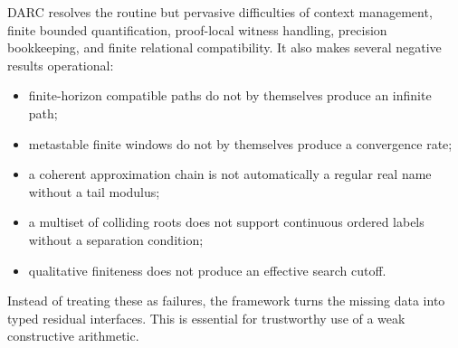 DARC resolves the routine but pervasive difficulties of context management,
finite bounded quantification, proof-local witness handling, precision
bookkeeping, and finite relational compatibility.  It also makes several
negative results operational:
\begin{itemize}
  \item finite-horizon compatible paths do not by themselves produce an
        infinite path;
  \item metastable finite windows do not by themselves produce a convergence
        rate;
  \item a coherent approximation chain is not automatically a regular real
        name without a tail modulus;
  \item a multiset of colliding roots does not support continuous ordered
        labels without a separation condition;
  \item qualitative finiteness does not produce an effective search cutoff.
\end{itemize}
Instead of treating these as failures, the framework turns the missing data
into typed residual interfaces.  This is essential for trustworthy use of a
weak constructive arithmetic.

